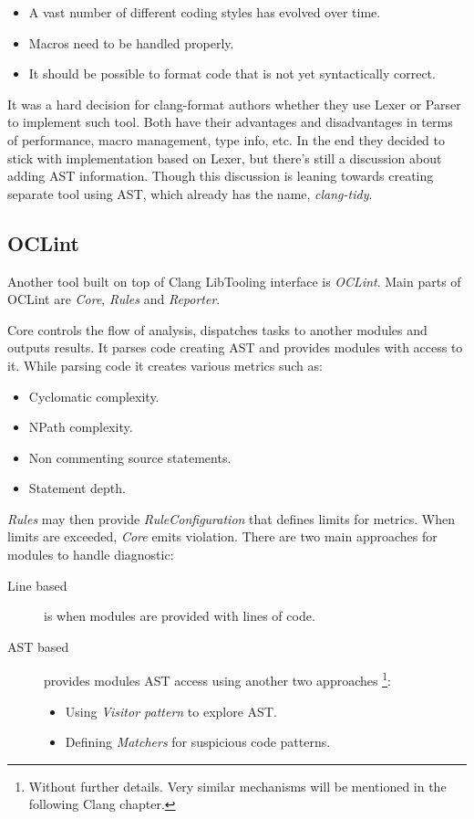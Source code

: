 \begin{itemize}
\item A vast number of different coding styles has evolved over time.
\item Macros need to be handled properly.
\item It should be possible to format code that is not yet syntactically correct.
\end{itemize}

It was a hard decision for clang-format authors whether they use Lexer or Parser to implement such tool. Both have their advantages and disadvantages in terms of performance, macro management, type info, etc. In the end they decided to stick with implementation based on Lexer, but there's still a discussion about adding AST information. Though this discussion is leaning towards creating separate tool using AST, which already has the name, \emph{clang-tidy}.

\subsection{OCLint}
Another tool built on top of Clang LibTooling interface is \emph{OCLint}. Main parts of OCLint are \emph{Core}, \emph{Rules} and \emph{Reporter}.

Core controls the flow of analysis, dispatches tasks to another modules and outputs results. It parses code creating AST and provides modules with access to it. While parsing code it creates various metrics such as:

\begin{itemize}
\item Cyclomatic complexity.
\item NPath complexity.
\item Non commenting source statements.
\item Statement depth.
\end{itemize}

\emph{Rules} may then provide \emph{RuleConfiguration} that defines limits for metrics. When limits  are exceeded, \emph{Core} emits violation. There are two main approaches for modules to handle diagnostic:

\begin{description}
\item[Line based] is when modules are provided with lines of code.
\item[AST based] provides modules AST access using another two approaches  \footnote{Without further details. Very similar mechanisms will be mentioned in the following Clang chapter.}:
	\begin{itemize}
	\item Using \emph{Visitor pattern} to explore AST.
	\item Defining \emph{Matchers} for suspicious code patterns.
	\end{itemize}
\end{description}

